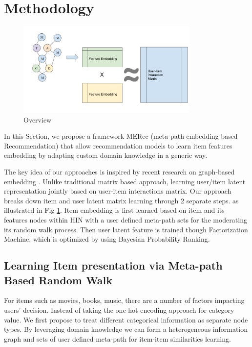\section{Methodology}

\begin{figure}[!t]
    \centering
    \includegraphics[width=0.8\textwidth]{figs/fig0.png}
    \caption{Overview}\label{fig:fe-overview}
\end{figure}

In this Section, we propose a framework MERec (meta-path embedding based Recommendation) that allow recommendation models to learn item features embedding by adapting custom domain knowledge in a generic way. 

The key idea of our approaches is inspired by recent research on graph-based embedding \cite{dong2017metapath2vec}. Unlike traditional matrix based approach, learning user/item latent representation jointly based on user-item interactions matrix. Our approach breaks down item and user latent matrix learning through 2 separate steps. as illustrated in Fig \ref{fig:fe-overview}. Item embedding is first learned based on item and its features nodes within HIN with a user defined meta-path sets for the moderating its random walk process. Then user latent feature is trained though Factorization Machine, which is optimized by using Bayesian Probability Ranking.

\subsection{Learning Item presentation via Meta-path Based Random Walk}\label{3MF}

For items such as movies, books, music, there are a number of factors impacting users' decision. Instead of taking the one-hot encoding approach for category value. We first propose to treat different categorical information as separate node types. 
By leveraging domain knowledge we can form a heterogeneous information graph and sets of user defined meta-path for item-item similarities learning. 


